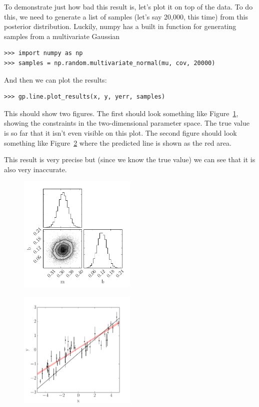 \documentclass[12pt,preprint]{aastex}
\newcommand{\project}[1]{{\sffamily #1}}
\newcommand{\Fig}[1]{Figure~\ref{fig:#1}}
\newcommand{\fig}[1]{\Fig{#1}}
\newcommand{\figlabel}[1]{\label{fig:#1}}
\begin{document}
To demonstrate just how bad this result is, let's plot it on top of the data.
To do this, we need to generate a list of samples (let's say 20,000, this
time) from this posterior distribution.
Luckily, \project{numpy} has a built in function for generating samples from a
multivariate Gaussian
\begin{lstlisting}
>>> import numpy as np
>>> samples = np.random.multivariate_normal(mu, cov, 20000)
\end{lstlisting}
And then we can plot the results:
\begin{lstlisting}
>>> gp.line.plot_results(x, y, yerr, samples)
\end{lstlisting}
This should show two figures.
The first should look something like \fig{line-lls-triangle}, showing the
constraints in the two-dimensional parameter space.
The true value is so far that it isn't even visible on this plot.
The second figure should look something like \fig{line-lls} where the
predicted line is shown as the red area.

This result is very precise but (since we know the true value) we can see that
it is also very inaccurate.

\begin{figure}[htbp]
\begin{center}
\includegraphics[width=0.5\textwidth]{figures/line_lls_triangle.pdf}
\end{center}
\caption{%
\figlabel{line-lls-triangle}}
\end{figure}

\begin{figure}[htbp]
\begin{center}
\includegraphics[width=0.5\textwidth]{figures/line_lls.pdf}
\end{center}
\caption{%
\figlabel{line-lls}}
\end{figure}
\end{document}
